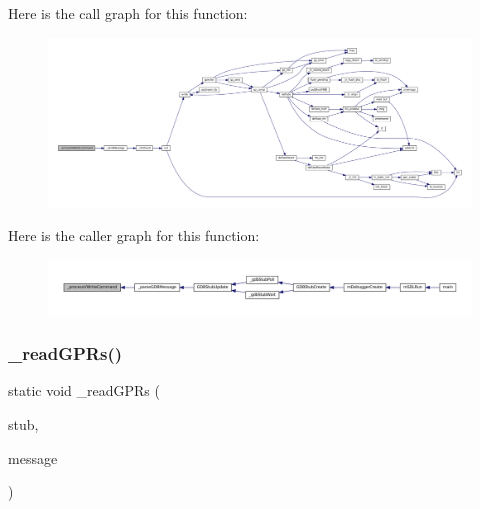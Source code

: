 Here is the call graph for this function\+:
\nopagebreak
\begin{figure}[H]
\begin{center}
\leavevmode
\includegraphics[width=350pt]{gdb-stub_8c_a582e9560a7cedd1a58761398f1761a0d_cgraph}
\end{center}
\end{figure}
Here is the caller graph for this function\+:
\nopagebreak
\begin{figure}[H]
\begin{center}
\leavevmode
\includegraphics[width=350pt]{gdb-stub_8c_a582e9560a7cedd1a58761398f1761a0d_icgraph}
\end{center}
\end{figure}
\mbox{\label{gdb-stub_8c_ab27c309a3277a098b285f7b0e65d4372}} 
\subsubsection{\texorpdfstring{\+\_\+read\+G\+P\+Rs()}{\_readGPRs()}}
{\footnotesize\ttfamily static void \+\_\+read\+G\+P\+Rs (\begin{DoxyParamCaption}\item[{struct G\+D\+B\+Stub $\ast$}]{stub,  }\item[{const char $\ast$}]{message }\end{DoxyParamCaption})\hspace{0.3cm}{\ttfamily [static]}}

